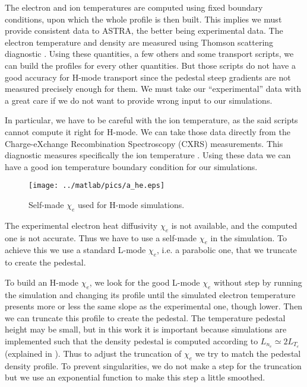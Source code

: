 The electron and ion temperatures are computed using fixed boundary conditions, upon which the whole profile is then built. This implies we must provide consistent data to ASTRA, the better being experimental data. The electron temperature and density are measured using Thomson scattering diagnostic \cite{thomson}. Using these quantities, a few others and some transport scripts, we can build the profiles for every other quantities. But those scripts do not have a good accuracy for H-mode transport since the pedestal steep gradients are not measured precisely enough for them. We must take our ``experimental'' data with a great care if we do not want to provide wrong input to our simulations.

In particular, we have to be careful with the ion temperature, as the said scripts cannot compute it right for H-mode. We can take those data directly from the Charge-eXchange Recombination Spectroscopy (CXRS) measurements. This diagnostic measures specifically the ion temperature \cite{bosshard2003}. Using these data we can have a good ion temperature boundary condition for our simulations.

\begin{wrapfigure}{l}{7cm}
\vspace{-0.5cm}
\texttt{[image: ../matlab/pics/a\_he.eps]}
\vspace{-0.5cm}
\caption{\footnotesize Self-made $\chi_e$ used for H-mode simulations.}
\vspace{-0.5cm}
\end{wrapfigure}
The experimental electron heat diffusivity $\chi_e$ is not available, and the computed one is not accurate. Thus we have to use a self-made $\chi_e$ in the simulation. To achieve this we use a standard L-mode $\chi_e$, i.e. a parabolic one, that we truncate to create the pedestal.

To build an H-mode $\chi_e$, we look for the good L-mode $\chi_e$ without step by running the simulation and changing its profile until the simulated electron temperature presents more or less the same slope as the experimental one, though lower. Then we can truncate this profile to create the pedestal. The temperature pedestal height may be small, but in this work it is important because simulations are implemented such that the density pedestal is computed according to $L_{n_e} \simeq 2 L_{T_e}$ (explained in ). Thus to adjust the truncation of $\chi_e$ we try to match the pedestal density profile. To prevent singularities, we do not make a step for the truncation but we use an exponential function to make this step a little smoothed.

